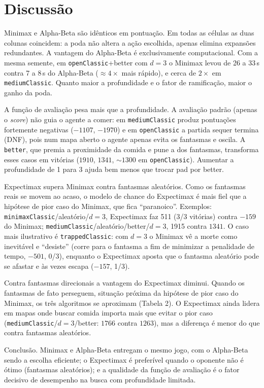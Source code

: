 \documentclass[11pt,a4paper]{article}
\begin{document}
\section{Discussão}

Minimax e Alpha-Beta são idênticos em pontuação. Em todas as células as duas colunas coincidem:
a poda não altera a ação escolhida, apenas elimina expansões redundantes. A vantagem do Alpha-Beta é
exclusivamente computacional. Com a mesma semente, em \texttt{openClassic}+better com $d=3$ o Minimax
levou de 26 a 33\,s contra 7 a 8\,s do Alpha-Beta ($\approx 4\times$ mais rápido), e cerca de $2\times$ em
\texttt{mediumClassic}. Quanto maior a profundidade e o fator de ramificação, maior o ganho da poda.

A função de avaliação pesa mais que a profundidade. A avaliação padrão (apenas o \emph{score})
não guia o agente a comer: em \texttt{mediumClassic} produz pontuações fortemente negativas
($-1107$, $-1970$) e em \texttt{openClassic} a partida sequer termina (DNF), pois num mapa aberto o
agente apenas evita os fantasmas e oscila. A \texttt{better}, que premia a proximidade da comida e pune
a dos fantasmas, transforma esses casos em vitórias ($1910$, $1341$, ${\sim}1300$ em
\texttt{openClassic}). Aumentar a profundidade de 1 para 3 ajuda bem menos que trocar pad por better.

Expectimax supera Minimax contra fantasmas aleatórios. Como os fantasmas reais se movem ao
acaso, o modelo de chance do Expectimax é mais fiel que a hipótese de pior caso do Minimax, que fica
``paranoico''. Exemplos: \texttt{minimaxClassic}/aleatório/$d{=}3$, Expectimax faz 511 (3/3
vitórias) contra $-159$ do Minimax; \texttt{mediumClassic}/aleatório/better/$d{=}3$, 1915
contra $1341$. O caso mais ilustrativo é \texttt{trappedClassic}: com $d=3$ o Minimax vê a morte como
inevitável e ``desiste'' (corre para o fantasma a fim de minimizar a penalidade de tempo, $-501$, 0/3),
enquanto o Expectimax aposta que o fantasma aleatório pode se afastar e às vezes escapa ($-157$, 1/3).

Contra fantasmas direcionais a vantagem do Expectimax diminui. Quando os fantasmas de fato
perseguem, situação próxima da hipótese de pior caso do Minimax, os três algoritmos se aproximam
(Tabela 2). O Expectimax ainda lidera em mapas onde buscar comida importa mais que evitar o pior caso
(\texttt{mediumClassic}/$d{=}3$/better: $1766$ contra $1263$), mas a diferença é menor do que contra
fantasmas aleatórios.

Conclusão. Minimax e Alpha-Beta entregam o mesmo jogo, com o Alpha-Beta sendo a escolha
eficiente; o Expectimax é preferível quando o oponente não é ótimo (fantasmas aleatórios); e a qualidade
da função de avaliação é o fator decisivo de desempenho na busca com profundidade limitada.
\end{document}
